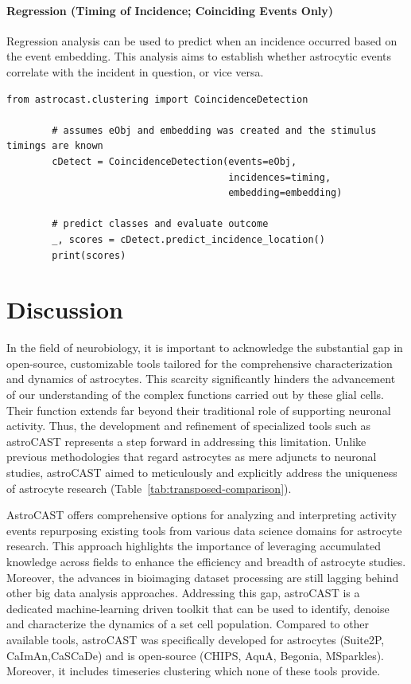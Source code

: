 \documentclass[utf8]{FrontiersinHarvard}
\newcommand{\tref}[1]{ (Table~\ref{tab:#1})}
\begin{document}
    \paragraph{Regression (Timing of Incidence; Coinciding Events Only)}
    Regression analysis can be used to predict when an incidence occurred based on the event embedding. This analysis aims to establish whether astrocytic events correlate with the incident in question, or vice versa.

    \begin{lstlisting}[style=pyStyle]
        from astrocast.clustering import CoincidenceDetection

        # assumes eObj and embedding was created and the stimulus timings are known
        cDetect = CoincidenceDetection(events=eObj,
                                       incidences=timing,
                                       embedding=embedding)

        # predict classes and evaluate outcome
        _, scores = cDetect.predict_incidence_location()
        print(scores)
    \end{lstlisting}


    \section{Discussion}
    In the field of neurobiology, it is important to acknowledge the substantial gap in open-source, customizable tools tailored for the comprehensive characterization and dynamics of astrocytes. This scarcity significantly hinders the advancement of our understanding of the complex functions carried out by these glial cells. Their function extends far beyond their traditional role of supporting neuronal activity\citep{montalant_role_2021,ransom_new_2003}. Thus, the development and refinement of specialized tools such as astroCAST represents a step forward in addressing this limitation. Unlike previous methodologies that regard astrocytes as mere adjuncts to neuronal studies, astroCAST aimed to meticulously and explicitly address the uniqueness of astrocyte research\tref{transposed-comparison}.

    AstroCAST offers comprehensive options for analyzing and interpreting activity events repurposing existing tools from various data science domains for astrocyte research. This approach highlights the importance of leveraging accumulated knowledge across fields to enhance the efficiency and breadth of astrocyte studies. Moreover, the advances in bioimaging dataset processing are still lagging behind other big data analysis approaches. Addressing this gap, astroCAST is a dedicated machine-learning driven toolkit that can be used to identify, denoise and characterize the dynamics of a set cell population. Compared to other available tools, astroCAST was specifically developed for astrocytes (Suite2P\citep{pachitariu_suite2p_2017}, CaImAn\citep{giovannucci_caiman_2019},CaSCaDe\citep{rupprecht_database_2021}) and is open-source (CHIPS\citep{barrett_chips_2018}, AquA\citep{wang_event-based_2018}, Begonia\citep{bjornstad_begoniatwo-photon_2021}, MSparkles\citep{stopper_novel_2022}). Moreover, it includes timeseries clustering which none of these tools provide.
\end{document}
